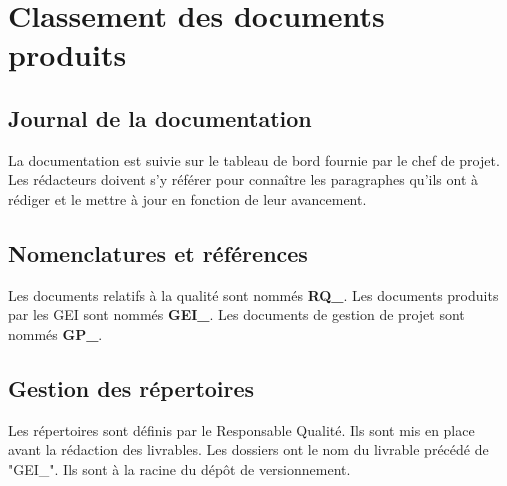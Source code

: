 \section{Classement des documents produits}

\subsection{Journal de la documentation}
La documentation est suivie sur le tableau de bord fournie par le chef de 
projet. Les rédacteurs doivent s'y référer pour connaître les paragraphes
qu'ils ont à rédiger et le mettre à jour en fonction de leur avancement.

\subsection{Nomenclatures et références}
Les documents relatifs à la qualité sont nommés \textbf{RQ\_}.
Les documents produits par les GEI sont nommés \textbf{GEI\_}.
Les documents de gestion de projet sont nommés \textbf{GP\_}.

\subsection{Gestion des répertoires}
Les répertoires sont définis par le Responsable Qualité. Ils sont mis en place
avant la rédaction des livrables. Les dossiers ont le nom du livrable précédé
de "GEI\_". Ils sont à la racine du dépôt de versionnement.

